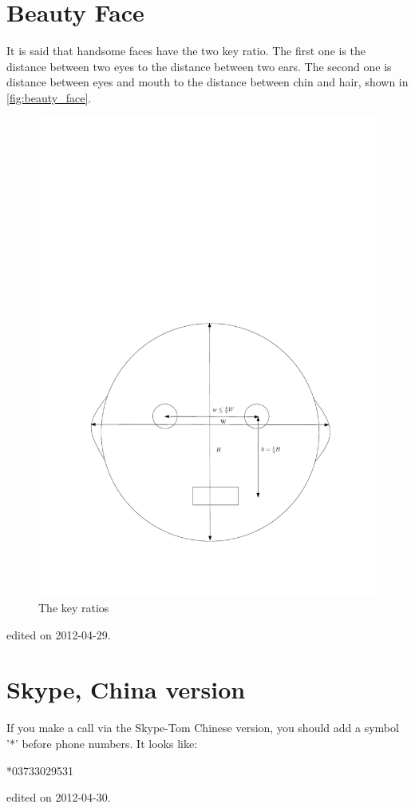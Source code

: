 \section{Beauty Face}
It is said that handsome faces have the two key ratio. The first one is the distance between two eyes to the distance between two ears. The second one is distance between eyes and mouth to the distance between chin and hair, shown in \autoref{fig:beauty_face}.
\begin{figure}
\begin{center}
\includegraphics[width=.7\linewidth]{gfx/beauty_face}
\end{center}
\caption{The key ratios}
\label{fig:beauty_face}
\end{figure}
\hfill {\tiny edited on 2012-04-29.}

\section{Skype, China version}
If you make a call via the Skype-Tom Chinese version, you should add a symbol '*' before phone numbers. It looks like:
\begin{center}
*03733029531
\end{center}
\hfill {\tiny edited on 2012-04-30.}
